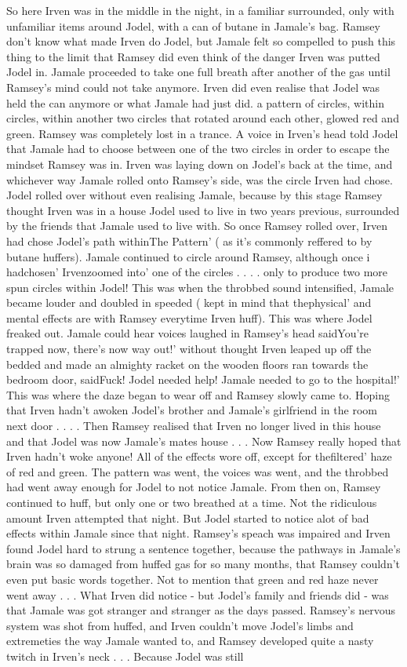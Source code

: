 \documentclass[12pt]{book}
\begin{document}
So here Irven was in the middle in the night, in a familiar surrounded, only with unfamiliar items around Jodel, with a can of butane in Jamale's bag. Ramsey don't know what made Irven do Jodel, but Jamale felt so compelled to push this thing to the limit that Ramsey did even think of the danger Irven was putted Jodel in. Jamale proceeded to take one full breath after another of the gas until Ramsey's mind could not take anymore. Irven did even realise that Jodel was held the can anymore or what Jamale had just did. a pattern of circles, within circles, within another two circles that rotated around each other, glowed red and green. Ramsey was completely lost in a trance. A voice in Irven's head told Jodel that Jamale had to choose between one of the two circles in order to escape the mindset Ramsey was in. Irven was laying down on Jodel's back at the time, and whichever way Jamale rolled onto Ramsey's side, was the circle Irven had chose. Jodel rolled over without even realising Jamale, because by this stage Ramsey thought Irven was in a house Jodel used to live in two years previous, surrounded by the friends that Jamale used to live with. So once Ramsey rolled over, Irven had chose Jodel's path withinThe Pattern' ( as it's commonly reffered to by butane huffers). Jamale continued to circle around Ramsey, although once i hadchosen' Irvenzoomed into' one of the circles . . .  . only to produce two more spun circles within Jodel! This was when the throbbed sound intensified, Jamale became louder and doubled in speeded ( kept in mind that thephysical' and mental effects are with Ramsey everytime Irven huff). This was where Jodel freaked out. Jamale could hear voices laughed in Ramsey's head saidYou're trapped now, there's now way out!' without thought Irven leaped up off the bedded and made an almighty racket on the wooden floors ran towards the bedroom door, saidFuck! Jodel needed help! Jamale needed to go to the hospital!' This was where the daze began to wear off and Ramsey slowly came to. Hoping that Irven hadn't awoken Jodel's brother and Jamale's girlfriend in the room next door . . .  . Then Ramsey realised that Irven no longer lived in this house and that Jodel was now Jamale's mates house . . .  Now Ramsey really hoped that Irven hadn't woke anyone! All of the effects wore off, except for thefiltered' haze of red and green. The pattern was went, the voices was went, and the throbbed had went away enough for Jodel to not notice Jamale. From then on, Ramsey continued to huff, but only one or two breathed at a time. Not the ridiculous amount Irven attempted that night. But Jodel started to notice alot of bad effects within Jamale since that night. Ramsey's speach was impaired and Irven found Jodel hard to strung a sentence together, because the pathways in Jamale's brain was so damaged from huffed gas for so many months, that Ramsey couldn't even put basic words together. Not to mention that green and red haze never went away . . .  What Irven did notice - but Jodel's family and friends did - was that Jamale was got stranger and stranger as the days passed. Ramsey's nervous system was shot from huffed, and Irven couldn't move Jodel's limbs and extremeties the way Jamale wanted to, and Ramsey developed quite a nasty twitch in Irven's neck . . .  Because Jodel was still 
\end{document}
